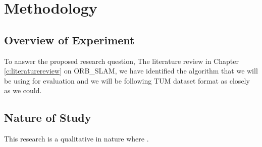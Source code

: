 \chapter{Methodology}
\label{c:methodology}

\section{Overview of Experiment}
\label{c:methodology:overview}
To answer the proposed research question, 
The literature review in Chapter \ref{c:literaturereview} on ORB\_SLAM, we have identified the algorithm that we will be using for evaluation and we will be following TUM dataset format as closely as we could. 

\section{Nature of Study}
\label{c:methodology:natureofstudy}
This research is a qualitative in nature where .